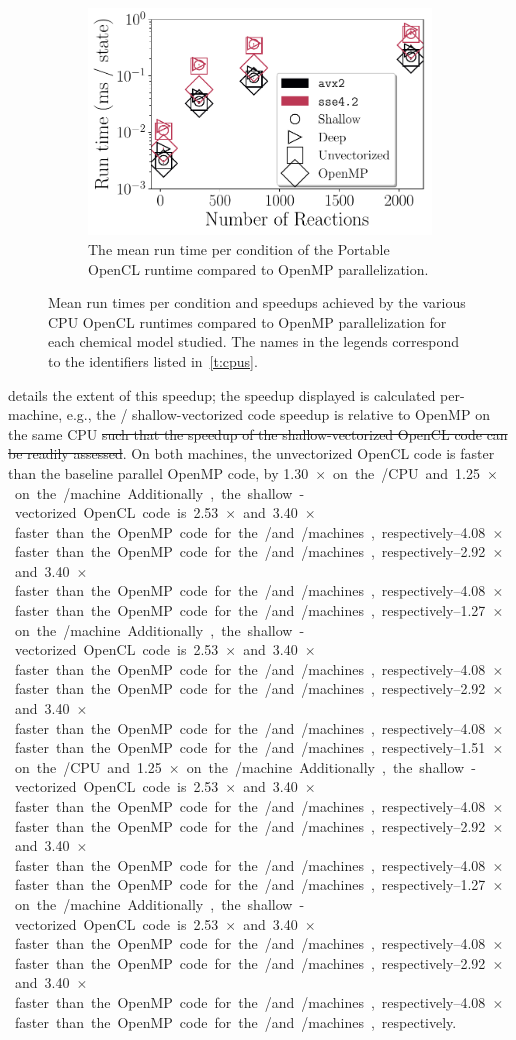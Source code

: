\documentclass[12pt,number,sort&compress,preprint]{elsarticle}
\newcommand{\revisedelete}[1]{\sloppy\textcolor{RoyalPurple}{\sout{#1}}} %
\begin{document}
\begin{figure}[htbp]
\begin{subfigure}[t]{0.48\linewidth}
      \includegraphics[width=\textwidth]{pocl_source_nonorm.pdf}
      \caption{The mean run time per condition of the Portable OpenCL runtime compared to OpenMP parallelization.}
      \label{F:pocl_source}
  \end{subfigure}
 \caption{Mean run times per condition and speedups achieved by the various CPU OpenCL runtimes compared to OpenMP parallelization for each chemical model studied. The names in the legends correspond to the identifiers listed in~\cref{t:cpus}.}
 \label{F:cpu_source}
\end{figure}

 details the extent of this speedup; the speedup displayed is calculated per-machine, e.g., the \avx/ shallow-vectorized code speedup is relative to OpenMP on the same CPU\revisedelete{ such that the speedup of the shallow-vectorized OpenCL code can be readily assessed}.
On both machines, the unvectorized OpenCL code is faster than the baseline parallel OpenMP code, by \SIrange{1.30}{1.51}{$\times$} on the \avx/ CPU and \SIrange{1.25}{1.27}{$\times$} on the \sse/ machine.
Additionally, the shallow-vectorized OpenCL code is \SIrange{2.53}{2.92}{$\times$} and \SIrange{3.40}{4.08}{$\times$} faster than the OpenMP code for the \sse/ and \avx/ machines, respectively.
\end{document}
